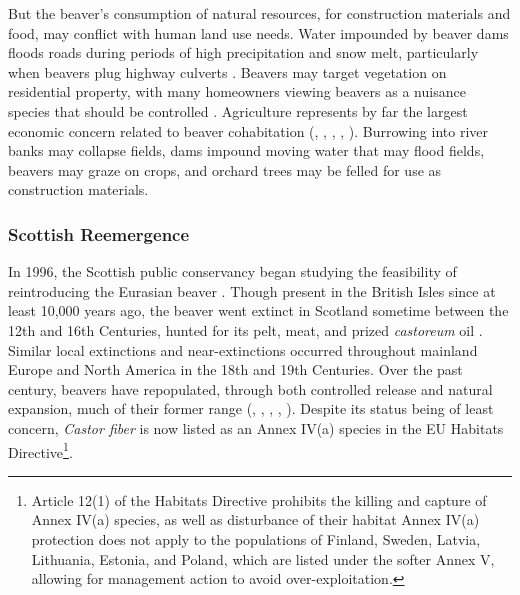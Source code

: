 But the beaver's consumption of natural resources, for construction materials and food, may conflict with human land use needs. Water impounded by beaver dams floods roads during periods of high precipitation and snow melt, particularly when beavers plug highway culverts \citep{jensen_habitat_2001}. Beavers may target vegetation on residential property, with many homeowners viewing beavers as a nuisance species that should be controlled \citep{jonker_experiences_2006}. Agriculture represents by far the largest economic concern related to beaver cohabitation (\cite{hamilton_tayside_2015}, \cite{noauthor_beavers_2017}, \cite{mikulka_european_2020}, \cite{janiszewski_damage_2019}, \cite{campbell-palmer_managing_2015}). Burrowing into river banks may collapse fields, dams impound moving water that may flood fields, beavers may graze on crops, and orchard trees may be felled for use as construction materials.

\subsubsection{Scottish Reemergence}

In 1996, the Scottish public conservancy began studying the feasibility of reintroducing the Eurasian beaver \citep{kitchener_history_1997}. Though present in the British Isles since at least 10,000 years ago, the beaver went extinct in Scotland sometime between the 12th and 16th Centuries, hunted for its pelt, meat, and prized \textit{castoreum} oil \citep{kitchener_history_1997}. Similar local extinctions and near-extinctions occurred throughout mainland Europe and North America in the 18th and 19th Centuries. Over the past century, beavers have repopulated, through both controlled release and natural expansion, much of their former range (\cite{dzieciolowski_reintroduction_1999}, \cite{janiszewski_restoration_2021}, \cite{schwab_beaver_2003}, \cite{hartman_patterns_1995}, \cite{dijkstra_reintroduction_1999}). Despite its status being of least concern, \textit{Castor fiber} is now listed as an Annex IV(a) species in the EU Habitats Directive\footnote{Article 12(1) of the Habitats Directive prohibits the killing and capture of Annex IV(a) species, as well as disturbance of their habitat \citep{noauthor_council_2013} Annex IV(a) protection does not apply to the populations of Finland, Sweden, Latvia, Lithuania, Estonia, and Poland, which are listed under the softer Annex V, allowing for management action to avoid over-exploitation.}. 

